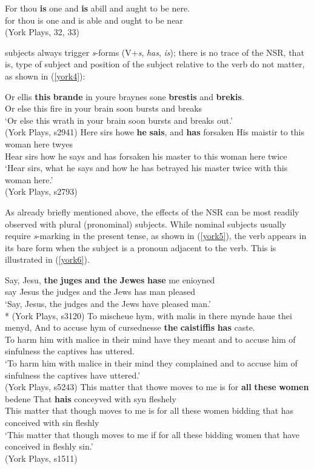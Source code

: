 \documentclass[output=paper]{langsci/langscibook}
\begin{document}
\ea
\gll For thou \textbf{is} one and \textbf{is} abill and aught to be nere.\\
for thou is one and is able and ought to be near\\
\glt (York Plays, 32, 33)
\z

\Tsg{} subjects always trigger \emph{s}-forms (V+\emph{s}, \emph{has},
\emph{is}); there is no trace of the \gls{NSR}, that
is, type of subject and position of the subject relative to the verb do not
matter, as shown in (\ref{york4}):

\ea
\label{york4}
\ea \gll Or ellis \textbf{this} \textbf{brande} in youre braynes sone \textbf{brestis} and \textbf{brekis}.\\
Or else this fire in your brain soon bursts and breaks\\
\glt `Or else this wrath in your brain soon bursts and breaks out.'\\
(York Plays, s2941)
\ex \gll Here sirs howe \textbf{he} \textbf{sais}, and \textbf{has} forsaken His maistir to this woman here twyes \\
Hear sirs how he says and has forsaken his master to this woman here twice\\
\glt `Hear sirs, what he says and how he has betrayed his master twice with this woman here.'\\
(York Plays, s2793)
\z
\z

As already briefly mentioned above, the effects of the \gls{NSR} can be most readily observed with plural (pronominal) subjects. While nominal \Tpl{} subjects usually require \emph{s}-marking in the present tense, as shown in (\ref{york5}), the verb appears in its bare form when the subject is a pronoun adjacent to the verb. This is illustrated in (\ref{york6}).

\ea
\label{york5}
\ea
\gll Say, Jesu, \textbf{the} \textbf{juges} \textbf{and} \textbf{the} \textbf{Jewes} \textbf{hase} me enioyned\\
say Jesus the judges and the Jews has man pleased\\
\glt `Say, Jesus, the judges and the Jews have pleased man.'\\*
(York Plays, s3120)
\ex
\gll To mischeue hym, with malis in there mynde haue thei menyd,
And to accuse hym of cursednesse \textbf{the} \textbf{caistiffis} \textbf{has} caste. \\
To harm him with malice in their mind have they meant and to accuse him of sinfulness the captives has uttered.\\
\glt `To harm him with malice in their mind they  complained and to accuse him of sinfulness the captives have uttered.'\\
(York Plays, s5243)
\ex
\gll This matter that thowe moves to me is for \textbf{all} \textbf{these} \textbf{women} bedene That \textbf{hais} conceyved with syn fleshely \\
    This matter that though moves to me is for all these women bidding that has conceived with sin fleshly\\
\glt `This matter that though moves to me if for all these bidding women that have conceived in fleshly sin.'\\
(York Plays, s1511)
\z
\z
\end{document}
